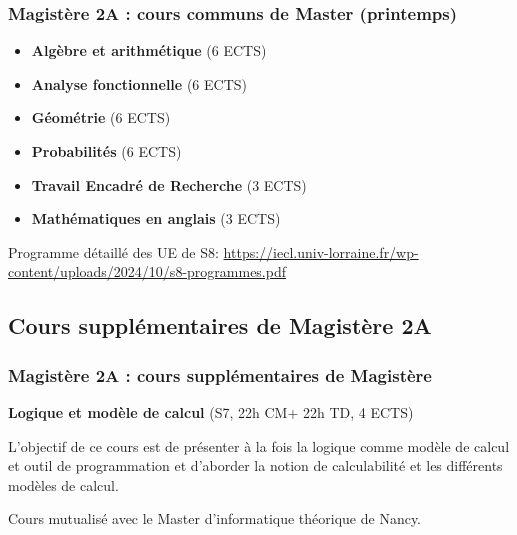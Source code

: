 \documentclass[slidetop,11pt]{beamer}
\begin{document}
\begin{frame}
\frametitle{Magistère 2A : cours communs de Master (printemps)}
\begin{itemize}
\item \textbf{Algèbre et arithmétique} (6 ECTS)
\item \textbf{Analyse fonctionnelle} (6 ECTS)
\item \textbf{Géométrie} (6 ECTS)
\item \textbf{Probabilités} (6 ECTS)
\item \textbf{Travail Encadré de Recherche} (3 ECTS)
\item \textbf{Mathématiques en anglais} (3 ECTS)
\end{itemize}


\bigskip
Programme détaillé des UE de S8: 
\url{https://iecl.univ-lorraine.fr/wp-content/uploads/2024/10/s8-programmes.pdf}
\end{frame}

\subsection{Cours supplémentaires de Magistère 2A}

\begin{frame}
\frametitle{Magistère 2A : cours supplémentaires de Magistère}

\textbf{Logique et modèle de calcul }
(S7, 22h CM+ 22h TD, 4 ECTS)

L'objectif de ce cours est de présenter à la fois la logique comme modèle de calcul et outil de programmation et d'aborder la notion de calculabilité et les différents modèles de calcul. 

Cours mutualisé avec le Master d'informatique théorique de Nancy.

\end{frame}


\end{document}
